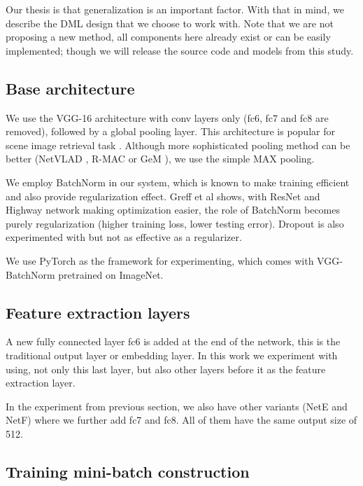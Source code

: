 \documentclass[10pt,twocolumn,letterpaper]{article}
\begin{document}
Our thesis is that generalization is an important factor. With that in mind, we describe the DML design that we choose to work with. Note that we are not proposing a new method, all components here already exist or can be easily implemented; though we will release the source code and models from this study. 

\subsection{Base architecture}

We use the VGG-16 architecture with conv layers only (fc6, fc7 and fc8 are removed), followed by a global pooling layer. This architecture is popular for scene image retrieval task \cite{arandjelovic2016netvlad,tolias2015particular,radenovic2016cnn,gordo2016deep}. Although more sophisticated pooling method can be better (NetVLAD \cite{arandjelovic2016netvlad}, R-MAC \cite{tolias2015particular} or GeM \cite{radenovic2017fine}), we use the simple MAX pooling.

We employ BatchNorm \cite{ioffe2015batch} in our system, which is known to make training efficient and also provide regularization effect. Greff  et al \cite{greff2016highway} shows, with ResNet and Highway network making optimization easier, the role of BatchNorm becomes purely regularization (higher training loss, lower testing error). Dropout is also experimented with but not as effective as a regularizer.

We use PyTorch as the framework for experimenting, which comes with VGG-BatchNorm pretrained on ImageNet.

\subsection{Feature extraction layers}

A new fully connected layer fc6 is added at the end of the network, this is the traditional output layer or embedding layer. In this work we experiment with using, not only this last layer, but also other layers before it as the feature extraction layer.

In the experiment from previous section, we also have other variants (NetE and NetF) where we further add fc7 and fc8. All of them have the same output size of 512.

\subsection{Training mini-batch construction}
\end{document}
